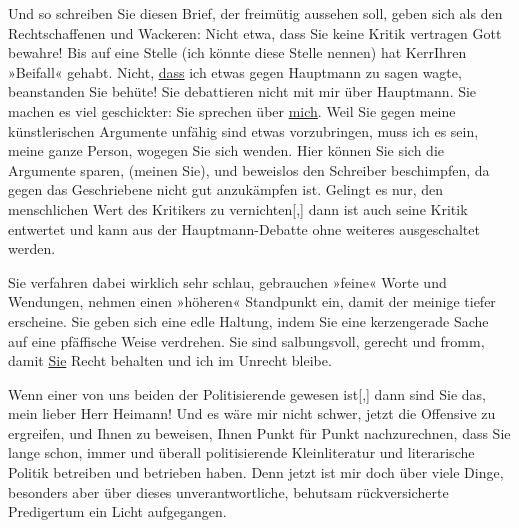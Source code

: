 \pstart
           Und so schreiben Sie diesen Brief, der freimütig aussehen soll, geben sich als den
               Rechtschaffenen und Wackeren: Nicht etwa, dass Sie keine Kritik vertragen {\dotstwo} Gott bewahre! Bis auf eine Stelle (ich könnte diese
               Stelle nennen) hat 
               KerrIhren »Beifall« gehabt. Nicht,
                  \uline{dass} ich etwas gegen Hauptmann zu sagen wagte, beanstanden Sie {\dotstwo} behüte! Sie debattieren nicht mit mir über Hauptmann. Sie machen es viel geschickter: Sie
               sprechen über \uline{mich}. Weil Sie gegen meine
               künstlerischen Argumente unfähig sind etwas vorzubringen, muss ich es sein, meine
               ganze Person, wogegen Sie sich wenden. Hier können Sie sich die Argumente sparen,
               (meinen Sie), und beweislos den Schreiber beschimpfen, da gegen das Geschriebene
               nicht gut anzukämpfen ist. Gelingt es nur, den menschlichen Wert des Kritikers zu
                  vernichten{[},{]} dann ist auch seine Kritik entwertet und kann aus der Hauptmann-Debatte ohne weiteres ausgeschaltet
               werden.\pend
           
\pstart
           Sie verfahren dabei wirklich sehr schlau, gebrauchen »feine« Worte und Wendungen,
               nehmen einen »höheren« Standpunkt ein, damit der meinige tiefer erscheine. Sie geben
               sich eine edle Haltung, indem Sie eine kerzengerade Sache auf eine pfäffische Weise
               verdrehen. Sie sind salbungsvoll, gerecht und fromm, damit \uline{Sie} Recht behalten und ich im Unrecht bleibe.\pend
           
\pstart
           Wenn einer von uns beiden der Politisierende gewesen ist{[},{]} dann
               sind Sie das, mein lieber Herr Heimann! Und es
               wäre mir nicht schwer, jetzt die Offensive zu ergreifen, und Ihnen zu beweisen, Ihnen
               Punkt für Punkt nachzurechnen, dass Sie lange schon, immer und überall politisierende Kleinliteratur und
               literarische Politik betreiben und betrieben haben. Denn jetzt ist mir doch über
               viele Dinge, besonders aber über dieses unverantwortliche, behutsam rückversicherte
               Predigertum ein Licht aufgegangen.\pend
           
